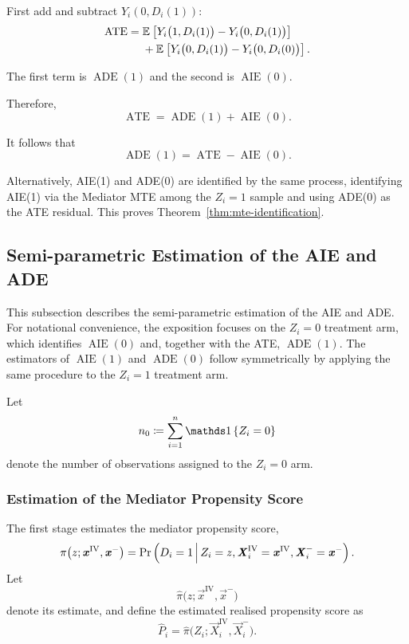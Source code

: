 First add and subtract $Y_i(0,D_i(1))$:
\[
    \begin{aligned}
    \operatorname{ATE}
    ={}&
    \mathbb{E}_{} \left[ 
        Y_i
        \big(
            1,D_i(1)
        \big)
        -
        Y_i
        \big(
            0,D_i(1)
        \big) \right]
    \\
    &+
    \mathbb{E}_{} \left[ 
        Y_i
        \big(
            0,D_i(1)
        \big)
        -
        Y_i
        \big(
            0,D_i(0)
        \big) \right].
    \end{aligned}
\]

The first term is $\operatorname{ADE}(1)$ and the second is $\operatorname{AIE}(0)$.

Therefore,
\[
    \operatorname{ATE}
    =
    \operatorname{ADE}(1)
    +
    \operatorname{AIE}(0).
    \label{eqn:ate-decomposition-z0}
\]

It follows that
\[
    \operatorname{ADE}(1)
    =
    \operatorname{ATE}
    -
    \operatorname{AIE}(0).
    \label{eqn:ade1-identification}
\]

Alternatively, AIE(1) and ADE(0) are identified by the same process, identifying AIE(1) via the Mediator MTE among the $Z_i =1$ sample and using ADE(0) as the ATE residual.
This proves Theorem~\ref{thm:mte-identification}.

\subsection{Semi-parametric Estimation of the AIE and ADE}
\label{appendix:semi-parametric}

This subsection describes the semi-parametric estimation of the AIE and ADE.
For notational convenience, the exposition focuses on the $Z_i=0$ treatment arm, which identifies $\operatorname{AIE}(0)$ and, together with the ATE, $\operatorname{ADE}(1)$.
The estimators of $\operatorname{AIE}(1)$ and $\operatorname{ADE}(0)$ follow symmetrically by applying the same procedure to the $Z_i=1$ treatment arm.

Let
\[
    n_0
    \coloneqq
    \sum_{i=1}^{n}
        \indicator{Z_i=0}
\]
denote the number of observations assigned to the $Z_i=0$ arm.

\subsubsection{Estimation of the Mediator Propensity Score}

The first stage estimates the mediator propensity score,
\[
    \pi
    \big(
        z;
        \boldsymbol{\mathit{x}}^{\mathrm{IV}},
        \boldsymbol{\mathit{x}}^-
    \big)
    =
    \Pr\left( 
        D_i=1
     \, \middle\vert \, 
        Z_i=z,
        \boldsymbol{\mathit{X}}_i^{\mathrm{IV}}=\boldsymbol{\mathit{x}}^{\mathrm{IV}},
        \boldsymbol{\mathit{X}}_i^-=\boldsymbol{\mathit{x}}^-
     \right).
\]
Let
\[
    \widehat\pi
    \big(
        z;
        \vec x^{\mathrm{IV}},
        \vec x^-
    \big)
\]
denote its estimate, and define the estimated realised propensity score as
\[
    \widehat P_i
    =
    \widehat\pi
    \big(
        Z_i;
        \vec X_i^{\mathrm{IV}},
        \vec X_i^-
    \big).
\]

